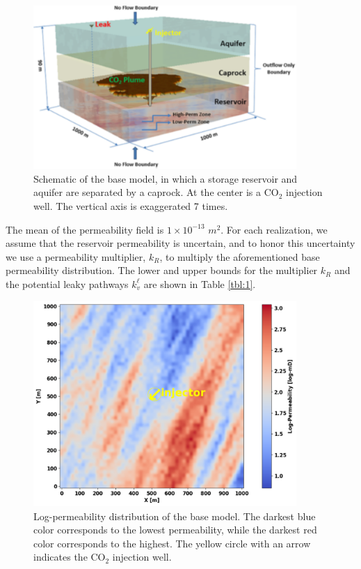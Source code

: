 \documentclass[a4paper,fleqn]{cas-sc}
\begin{document}
\begin{figure}
    \centering
    \includegraphics[width=10cm]{figs/Figure 5.pdf}
    \caption{Schematic of the base model, in which a storage reservoir and aquifer are separated by a caprock. At the center is a CO$_2$ injection well. The vertical axis is exaggerated 7 times.}
    \label{model}
\end{figure}

The mean of the permeability field is $1\times10^{-13}$ $m^2$. For each realization, we assume that the reservoir permeability is uncertain, and to honor this uncertainty we use a permeability multiplier, $k_R$, to multiply the aforementioned base permeability distribution. The lower and upper bounds for the multiplier $k_R$ and the potential leaky pathways $k_v^\ell$ are shown in Table \ref{tbl:1}. 

\begin{figure}
    \centering
    \includegraphics[width=10cm]{figs/Figure 6.pdf}
    \caption{Log-permeability distribution of the base model. The darkest blue color corresponds to the lowest permeability, while the darkest red color corresponds to the highest. The yellow circle with an arrow indicates the CO$_2$ injection well.}
    \label{perm_hete}
\end{figure}
\end{document}
